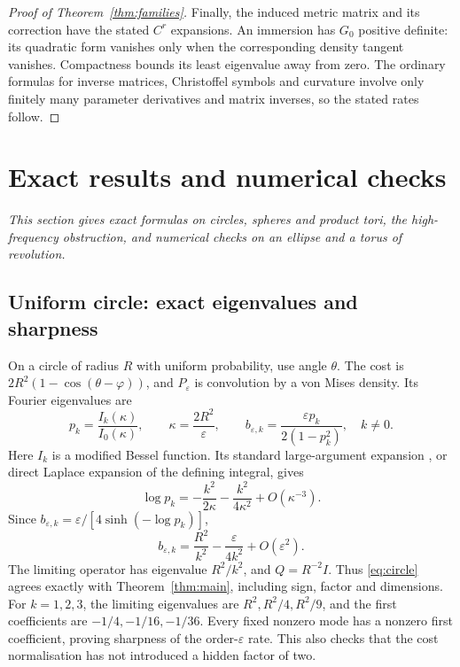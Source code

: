 \documentclass[11pt,a4paper]{article}
\theoremstyle{definition}\newtheorem{definition}[theorem]{Definition}
\theoremstyle{remark}\newtheorem{remark}[theorem]{Remark}
\newcommand{\eps}{\varepsilon}
\begin{document}
\begin{proof}[Proof of Theorem~\ref{thm:families}]
Finally, the induced metric matrix and its correction have the stated $C^r$ expansions. An immersion has $G_0$ positive definite: its quadratic form vanishes only when the corresponding density tangent vanishes. Compactness bounds its least eigenvalue away from zero. The ordinary formulas for inverse matrices, Christoffel symbols and curvature involve only finitely many parameter derivatives and matrix inverses, so the stated rates follow.
\end{proof}

\section{Exact results and numerical checks}\label{sec:checks}

\noindent\emph{This section gives exact formulas on circles, spheres and product tori, the high-frequency obstruction, and numerical checks on an ellipse and a torus of revolution.}

\subsection{Uniform circle: exact eigenvalues and sharpness}
On a circle of radius $R$ with uniform probability, use angle $\theta$. The cost is
$2R^2(1-\cos(\theta-\varphi))$, and $P_\eps$ is convolution by a von Mises density. Its Fourier eigenvalues are
\begin{equation}\label{eq:Bessel}
p_k=\frac{I_k(\kappa)}{I_0(\kappa)},\qquad
\kappa=\frac{2R^2}{\eps},\qquad
b_{\eps,k}=\frac{\eps p_k}{2(1-p_k^2)},\quad k\ne0.
\end{equation}
Here $I_k$ is a modified Bessel function. Its standard large-argument expansion \cite{DLMF}, or direct Laplace expansion of the defining integral, gives
\[
\log p_k=-\frac{k^2}{2\kappa}-\frac{k^2}{4\kappa^2}+O(\kappa^{-3}).
\]
Since $b_{\eps,k}=\eps/[4\sinh(-\log p_k)]$,
\begin{equation}\label{eq:circle}
b_{\eps,k}=\frac{R^2}{k^2}-\frac{\eps}{4k^2}+O(\eps^2).
\end{equation}
The limiting operator has eigenvalue $R^2/k^2$, and $Q=R^{-2}I$. Thus \eqref{eq:circle} agrees exactly with Theorem~\ref{thm:main}, including sign, factor and dimensions. For $k=1,2,3$, the limiting eigenvalues are $R^2,R^2/4,R^2/9$, and the first coefficients are $-1/4,-1/16,-1/36$. Every fixed nonzero mode has a nonzero first coefficient, proving sharpness of the order-$\eps$ rate. This also checks that the cost normalisation has not introduced a hidden factor of two.
\end{document}
